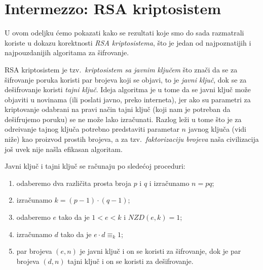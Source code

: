 %
%  
%
%
%  

\section{Intermezzo: RSA kriptosistem}

  U ovom odeljku \'cemo pokazati kako se rezultati koje smo do sada razmatrali koriste u dokazu korektnosti
  \emph{RSA kriptosistema}, \v sto je jedan od najpoznatijih i najpouzdanijih algoritama za \v sifrovanje.

  RSA kriptosistem je tzv.\ \emph{kriptosistem sa javnim klju\v cem} \v sto zna\v ci da se
  za \v sifrovanje poruka koristi par brojeva koji se objavi, to je \emph{javni klju\v c},
  dok se za de\v sifrovanje koristi \emph{tajni klju\v c}.
  Ideja algoritma je u tome da se javni klju\v c mo\v ze objaviti u novinama (ili poslati javno, preko interneta),
  jer ako su parametri za kriptovanje odabrani na pravi na\v cin tajni klju\v c (koji nam je potreban da de\v sifrujemo
  poruku) se ne mo\v ze lako izra\v cunati. Razlog le\v zi u tome \v sto je za odre\dj ivanje tajnog klju\v ca
  potrebno predstaviti parametar $n$ javnog klju\v ca (vidi ni\v ze) kao proizvod prostih brojeva, a za
  tzv.\ \emph{faktorizaciju brojeva} na\v sa civilizacija jo\v s uvek nije na\v sla efikasan algoritam.
  
  \medskip
  
  Javni klju\v c i tajni klju\v c se ra\v cunaju po slede\'coj proceduri:
  \begin{enumerate}\itemsep -1.5pt
  \item odaberemo dva razli\v cita prosta broja $p$ i $q$ i izra\v cunamo $n = pq$;
  \item izra\v cunamo $k = (p - 1)\cdot(q - 1)$;
  \item odaberemo $e$ tako da je $1 < e < k$ i $\mathit{NZD}(e, k) = 1$;
  \item izra\v cunamo $d$ tako da je $e \cdot d \equiv_k 1$;
  \item par brojeva $(e, n)$ je javni klju\v c i on se koristi za \v sifrovanje, dok je par brojeva $(d, n)$
        tajni klju\v c i on se koristi za de\v sifrovanje.
  \end{enumerate}
  
